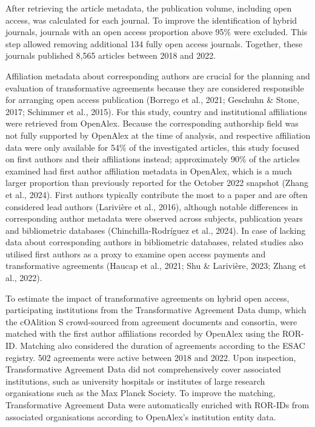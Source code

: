 \documentclass[a4paper,man,floatsintext,longtable,noextraspace,12pt]{apa6}
\begin{document}
After retrieving the article metadata, the publication volume, including
open access, was calculated for each journal. To improve the
identification of hybrid journals, journals with an open access
proportion above 95\% were excluded. This step allowed removing
additional 134 fully open access journals. Together, these journals
published 8,565 articles between 2018 and 2022.

Affiliation metadata about corresponding authors are crucial for the
planning and evaluation of transformative agreements because they are
considered responsible for arranging open access publication (Borrego et
al., 2021; Geschuhn \& Stone, 2017; Schimmer et al., 2015). For this
study, country and institutional affiliations were retrieved from
OpenAlex. Because the corresponding authorship field was not fully
supported by OpenAlex at the time of analysis, and respective
affiliation data were only available for 54\% of the investigated
articles, this study focused on first authors and their affiliations
instead; approximately 90\% of the articles examined had first author
affiliation metadata in OpenAlex, which is a much larger proportion than
previously reported for the October 2022 snapshot (Zhang et al., 2024).
First authors typically contribute the most to a paper and are often
considered lead authors (Larivière et al., 2016), although notable
differences in corresponding author metadata were observed across
subjects, publication years and bibliometric databases
(Chinchilla-Rodríguez et al., 2024). In case of lacking data about
corresponding authors in bibliometric databases, related studies also
utilised first authors as a proxy to examine open access payments and
transformative agreements (Haucap et al., 2021; Shu \& Larivière, 2023;
Zhang et al., 2022).

To estimate the impact of transformative agreements on hybrid open
access, participating institutions from the Transformative Agreement
Data dump, which the cOAlition S crowd-sourced from agreement documents
and consortia, were matched with the first author affiliations recorded
by OpenAlex using the ROR-ID. Matching also considered the duration of
agreements according to the ESAC registry. 502 agreements were active
between 2018 and 2022. Upon inspection, Transformative Agreement Data
did not comprehensively cover associated institutions, such as
university hospitals or institutes of large research organisations such
as the Max Planck Society. To improve the matching, Transformative
Agreement Data were automatically enriched with ROR-IDs from associated
organisations according to OpenAlex's institution entity data.
\end{document}
